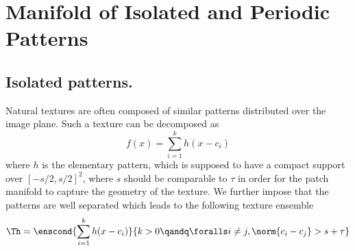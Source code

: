 




\section{Manifold of Isolated and Periodic Patterns}
\label{sect-manifold-patterns}

\subsection{Isolated patterns.}

Natural textures are often composed of similar patterns distributed over the image plane. Such a texture can be decomposed as
\begin{equation*}
	f(x) = \sum_{i=1}^k h(x-c_i)
\end{equation*}
where $h$ is the elementary pattern, which is supposed to have a compact support over $[-s/2,s/2]^2$, where $s$ should be comparable to $\tau$ in order for the patch manifold to capture the geometry of the texture. We further impose that the patterns are well separated which leads to the following texture ensemble
\begin{equation*}
	\Th = \enscond{ \sum_{i=1}^k h(x-c_i) }{ k>0 \qandq \foralls i\neq j, \norm{c_i-c_j}>s+\tau}
\end{equation*}


